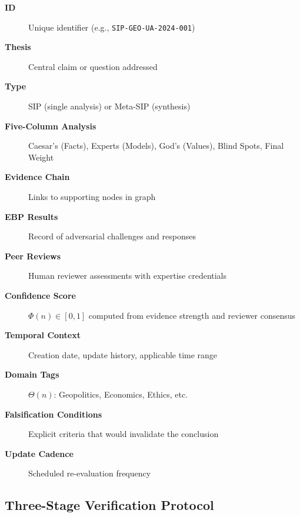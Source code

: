\documentclass[11pt,a4paper]{article}
\theoremstyle{definition}
\theoremstyle{remark}
\newcommand{\SIP}{\textsc{SIP}}
\newcommand{\EBP}{\textsc{EBP}}
\begin{document}
\begin{mdframed}[style=implementationbox, frametitle={Knowledge Node Schema}]
\begin{description}
    \item[\textbf{ID}] Unique identifier (e.g., \texttt{SIP-GEO-UA-2024-001})
    \item[\textbf{Thesis}] Central claim or question addressed
    \item[\textbf{Type}] \SIP{} (single analysis) or Meta-\SIP{} (synthesis)
    \item[\textbf{Five-Column Analysis}] Caesar's (Facts), Experts (Models), God's (Values), Blind Spots, Final Weight
    \item[\textbf{Evidence Chain}] Links to supporting nodes in graph
    \item[\textbf{\EBP{} Results}] Record of adversarial challenges and responses
    \item[\textbf{Peer Reviews}] Human reviewer assessments with expertise credentials
    \item[\textbf{Confidence Score}] $\Phi(n) \in [0,1]$ computed from evidence strength and reviewer consensus
    \item[\textbf{Temporal Context}] Creation date, update history, applicable time range
    \item[\textbf{Domain Tags}] $\Theta(n)$: Geopolitics, Economics, Ethics, etc.
    \item[\textbf{Falsification Conditions}] Explicit criteria that would invalidate the conclusion
    \item[\textbf{Update Cadence}] Scheduled re-evaluation frequency
\end{description}
\end{mdframed}

\subsection{Three-Stage Verification Protocol}
\end{document}
